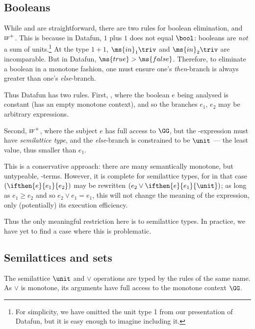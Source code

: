 \subsection{Booleans}
\label{sec:typing-rules-booleans}

While  and  are straightforward, there are two rules for
boolean elimination,  and $\textsc{if}^+$. This is because in Datafun, $1$
plus $1$ does not equal $\bool$: booleans are \emph{not} a sum of
units.\footnote{For simplicity, we have omitted the unit type 1 from our
  presentation of Datafun, but it is easy enough to imagine including it.} At
the type $1 + 1$, $\ms{in}_1 \triv$ and $\ms{in}_2 \triv$ are incomparable. But
in Datafun, $\ms{true} > \ms{false}$. Therefore, to eliminate a boolean in a
monotone fashion, one must ensure one's \emph{then}-branch is always greater
than one's \emph{else}-branch.

Thus Datafun has two  rules. First, , where the boolean $e$ being
analysed is constant (has an empty monotone context), and so the branches $e_1$,
$e_2$ may be arbitrary expressions.

Second, $\textsc{if}^+$, where the subject $e$ has full access to $\GG$, but the
-expression must have \emph{semilattice type}, and the \emph{else}-branch
is constrained to be $\unit$ --- the least value, thus smaller than $e_1$.

This is a conservative approach: there are many semantically monotone, but
untypeable, -terms. However, it is complete for semilattice types, for in
that case $(\ifthen{e}{e_1}{e_2})$ may be rewritten $(e_2 \vee
\ifthen{e}{e_1}{\unit})$; as long as $e_1 \ge e_2$ and so $e_2 \vee e_1 = e_1$,
this will not change the meaning of the expression, only (potentially) its
execution efficiency.

Thus the only meaningful restriction here is to semilattice types. In practice,
we have yet to find a case where this is problematic.


\subsection{Semilattices and sets}
The semilattice $\unit$ and $\vee$ operations are typed by the rules of the same
name. As $\vee$ is monotone, its arguments have full access to the monotone
context $\GG$.

